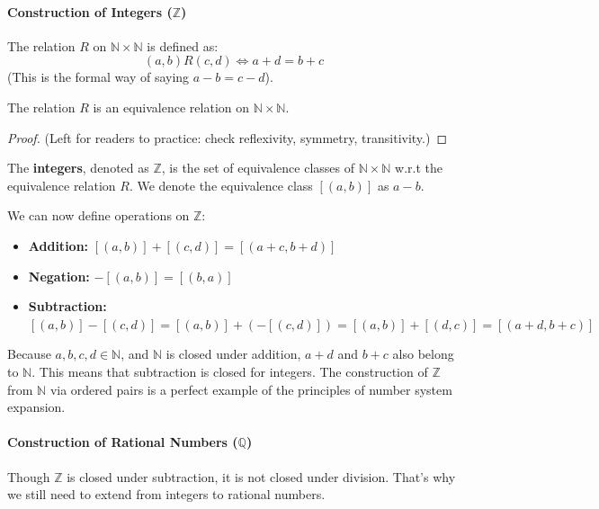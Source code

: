 \documentclass[oneside]{book}
\begin{document}
\paragraph{Construction of Integers ($\mathbb{Z}$)}
\begin{definition}
The relation $R$ on $\mathbb{N} \times \mathbb{N}$ is defined as:
$$ (a,b) R (c,d) \iff a+d = b+c $$
(This is the formal way of saying $a-b = c-d$).
\end{definition}

\begin{theorem}
The relation $R$ is an equivalence relation on $\mathbb{N} \times \mathbb{N}$.
\end{theorem}
\begin{proof}
(Left for readers to practice: check reflexivity, symmetry, transitivity.)
\end{proof}

\begin{definition}
The \textbf{integers}, denoted as $\mathbb{Z}$, is the set of equivalence classes of $\mathbb{N} \times \mathbb{N}$ w.r.t the equivalence relation $R$. We denote the equivalence class $[(a,b)]$ as $a-b$.
\end{definition}

We can now define operations on $\mathbb{Z}$:
\begin{definition}
\begin{itemize}
    \item \textbf{Addition:} $[(a,b)] + [(c,d)] = [(a+c, b+d)]$
    \item \textbf{Negation:} $-[(a,b)] = [(b,a)]$
    \item \textbf{Subtraction:} $[(a,b)] - [(c,d)] = [(a,b)] + (-[(c,d)]) = [(a,b)] + [(d,c)] = [(a+d, b+c)]$
\end{itemize}
\end{definition}
Because $a,b,c,d \in \mathbb{N}$, and $\mathbb{N}$ is closed under addition, $a+d$ and $b+c$ also belong to $\mathbb{N}$. This means that subtraction is closed for integers. The construction of $\mathbb{Z}$ from $\mathbb{N}$ via ordered pairs is a perfect example of the principles of number system expansion.

\paragraph{Construction of Rational Numbers ($\mathbb{Q}$)}
Though $\mathbb{Z}$ is closed under subtraction, it is not closed under division. That’s why we still need to extend from integers to rational numbers.
\end{document}
